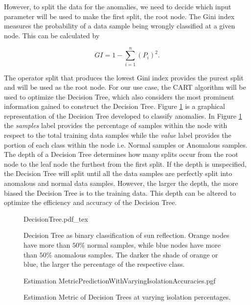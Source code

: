 However, to split the data for the anomalies, we need to decide which input parameter will be used to make the first split, the root node. The Gini index measures the probability of a data sample being wrongly classified at a given node. This can be calculated by

\begin{equation}
GI = 1 - \sum_{i = 1}^{n}{(P_i)^2}.
\label{eq:Gini index}
\end{equation}

The operator split that produces the lowest Gini index provides the purest split and will be used as the root node. For our use case, the CART algorithm will be used to optimize the Decision Tree, which also considers the most prominent information gained to construct the Decision Tree. Figure \ref{fig:DecisionTree} is a graphical representation of the Decision Tree developed to classify anomalies. In Figure \ref{fig:DecisionTree} the \emph{samples} label provides the percentage of samples within the node with respect to the total training data samples while the \emph{value} label provides the portion of each class within the node i.e. Normal samples or Anomalous samples. The depth of a Decision Tree determines how many splits occur from the root node to the leaf node the furthest from the first split. If the depth is unspecified, the Decision Tree will split until all the data samples are perfectly split into anomalous and normal data samples. However, the larger the depth, the more biased the Decision Tree is to the training data. This depth can be altered to optimize the efficiency and accuracy of the Decision Tree.

\begin{figure}[!hbt]
	\centering
	\def\svgwidth{16cm}
	{DecisionTree.pdf_tex}
	\caption{Decision Tree as binary classification of sun reflection. Orange nodes have more than $50\%$ normal samples, while blue nodes have more than $50\%$ anomalous samples. The darker the shade of orange or blue, the larger the percentage of the respective class.}
	\label{fig:DecisionTree}
\end{figure}

\begin{figure}[!htb]
	\centering
	{Estimation MetricPredictionWithVaryingIsolationAccuracies.pgf}
	
	\caption{Estimation Metric of Decision Trees at varying isolation percentages.}
	\label{fig:DecisionTreesWithVaryingIsolationEstimation}
\end{figure}

